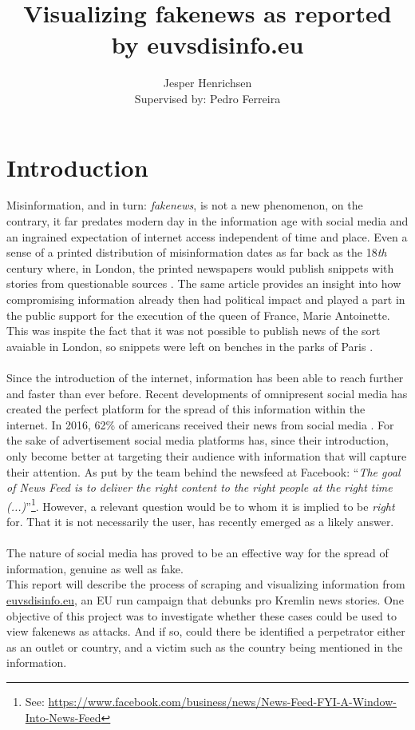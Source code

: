 \documentclass{article}
\title{Visualizing fakenews as reported by euvsdisinfo.eu}
\author{Jesper Henrichsen \\{\small Supervised by: Pedro Ferreira}}
\begin{document}
\maketitle
\newpage
\tableofcontents
\listoffigures
\newpage

\section{Introduction}
Misinformation, and in turn: {\it fakenews}, is not a new phenomenon, on the contrary, it far predates modern day in the information age with social media and an ingrained expectation of internet access independent of time and place. Even a sense of a printed distribution of misinformation dates as far back as the 18{\it th} century where, in London, the printed newspapers would publish snippets with stories from questionable sources \cite{first_propaganda}. The same article provides an insight into how compromising information already then had political impact and played a part in the public support for the execution of the queen of France, Marie Antoinette. This was inspite the fact that it was not possible to publish news of the sort avaiable in London, so snippets were left on benches in the parks of Paris \cite{first_propaganda}.
\\\\
Since the introduction of the internet, information has been able to reach further and faster than ever before. Recent developments of omnipresent social media has created the perfect platform for the spread of this information within the internet. In 2016, 62\% of americans received their news from social media \cite{gottfried2016news}. For the sake of advertisement social media platforms has, since their introduction, only become better at targeting their audience with information that will capture their attention. As put by the team behind the newsfeed at Facebook: ``{\it The goal of News Feed is to deliver the right content to the right people at the right time (...)}''\footnote{See: \url{https://www.facebook.com/business/news/News-Feed-FYI-A-Window-Into-News-Feed}}. However, a relevant question would be to whom it is implied to be {\it right} for. That it is not necessarily the user, has recently emerged as a likely answer.
\\\\
The nature of social media has proved to be an effective way for the spread of information, genuine as well as fake.\\
This report will describe the process of scraping and visualizing information from \href{https://euvsdisinfo.eu}{euvsdisinfo.eu}, an EU run campaign that debunks pro Kremlin news stories. One objective of this project was to investigate whether these cases could be used to view fakenews as attacks. And if so, could there be identified a perpetrator either as an outlet or country, and a victim such as the country being mentioned in the information.
\end{document}
